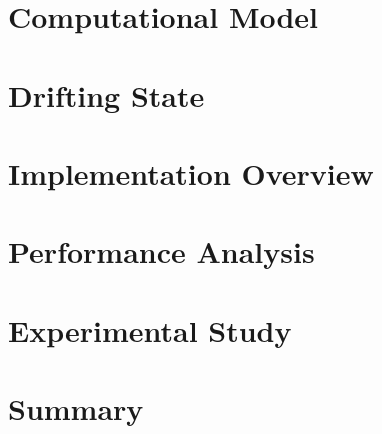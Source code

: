 \section{Computational Model}

\section{Drifting State}

\section{Implementation Overview}

\section{Performance Analysis}

\section{Experimental Study}

\section{Summary}